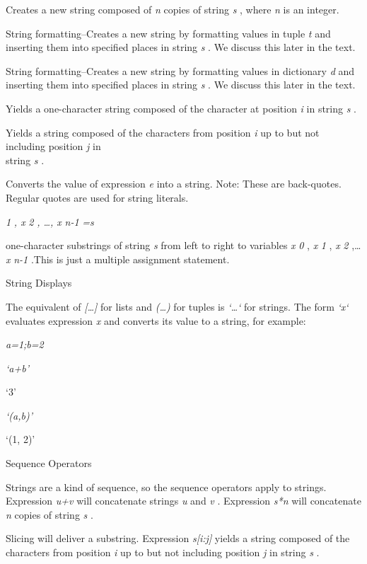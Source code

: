 Creates a new string composed of
\emph{n} copies of string \emph{s} , where \emph{n} is an integer.



String formatting--Creates a new
string by formatting values in tuple \emph{t} and inserting them into
specified places in string \emph{s} . We discuss this later in the text.



String formatting--Creates a new
string by formatting values in dictionary \emph{d} and inserting them
into specified places in string \emph{s} . We discuss this later in the
text.



Yields a one-character string
composed of the character at position \emph{i} in string \emph{s} .



Yields a string composed of the
characters from position \emph{i} up to but not including position
\emph{j} in\\
string \emph{s} .



Converts the value of expression
\emph{e} into a string. Note: These are back-quotes. Regular quotes are
used for string literals.


\emph{1} \emph{, x} \emph{2} \emph{, \ldots{}, x} \emph{n-1} \emph{=s}

 one-character
substrings of string \emph{s} from left to right to variables \emph{x}
\emph{0} , \emph{x} \emph{1} , \emph{x} \emph{2} ,\ldots{} \emph{x}
\emph{n-1} .This is just a multiple assignment statement.

String Displays

The equivalent of
\emph{{[}\ldots{}{]}} for lists and \emph{(\ldots{})} for tuples is
\emph{`\ldots{}`} for strings. The form \emph{`x`} evaluates expression
\emph{x} and converts its value to a string, for example:


\emph{a=1;b=2}


\emph{`a+b'}

`3'


\emph{`(a,b)'}

`(1, 2)'

Sequence Operators

Strings are a kind of sequence, so
the sequence operators apply to strings. Expression \emph{u+v} will
concatenate strings \emph{u} and \emph{v} . Expression \emph{s*n} will
concatenate \emph{n} copies of string \emph{s} .

Slicing will deliver a substring.
Expression \emph{s{[}i:j{]}} yields a string composed of the characters
from position \emph{i} up to but not including position \emph{j} in
string \emph{s} .

